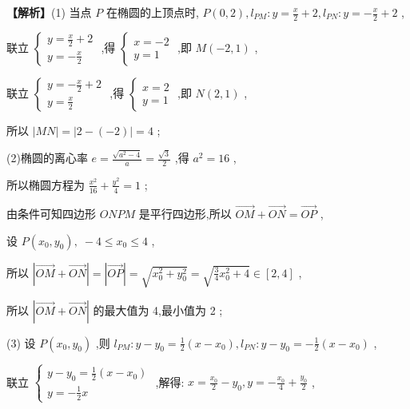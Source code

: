 \documentclass[10pt]{article}
\begin{document}
\textbf{【解析】}(1) 当点 \(P\) 在椭圆的上顶点时, \(P\left( {0,2}\right) ,{l}_{PM} : y = \frac{x}{2} + 2,{l}_{PN} : y =  - \frac{x}{2} + 2\) ,

联立 \(\left\{  \begin{array}{l} y = \frac{x}{2} + 2 \\  y =  - \frac{x}{2} \end{array}\right.\) ,得 \(\left\{  \begin{array}{l} x =  - 2 \\  y = 1 \end{array}\right.\) ,即 \(M\left( {-2,1}\right)\) ,

联立 \(\left\{  \begin{array}{l} y =  - \frac{x}{2} + 2 \\  y = \frac{x}{2} \end{array}\right.\) ,得 \(\left\{  \begin{array}{l} x = 2 \\  y = 1 \end{array}\right.\) ,即 \(N\left( {2,1}\right)\) ,

所以 \(\left| {MN}\right|  = \left| {2 - \left( {-2}\right) }\right|  = 4\) ;

(2)椭圆的离心率 \(e = \frac{\sqrt{{a}^{2} - 4}}{a} = \frac{\sqrt{3}}{2}\) ,得 \({a}^{2} = {16}\) ,

所以椭圆方程为 \(\frac{{x}^{2}}{16} + \frac{{y}^{2}}{4} = 1\) ;

由条件可知四边形 \({ONPM}\) 是平行四边形,所以 \(\overrightarrow{OM} + \overrightarrow{ON} = \overrightarrow{OP}\) ,

设 \(P\left( {{x}_{0},{y}_{0}}\right) ,\; - 4 \leq  {x}_{0} \leq  4\) ,

所以 \(\left| {\overrightarrow{OM} + \overrightarrow{ON}}\right|  = \left| \overrightarrow{OP}\right|  = \sqrt{{x}_{0}^{2} + {y}_{0}^{2}} = \sqrt{\frac{3}{4}{x}_{0}^{2} + 4} \in  \left\lbrack  {2,4}\right\rbrack\) ,

所以 \(\left| {\overrightarrow{OM} + \overrightarrow{ON}}\right|\) 的最大值为 4,最小值为 2 ;

(3) 设 \(P\left( {{x}_{0},{y}_{0}}\right)\) ,则 \({l}_{PM} : y - {y}_{0} = \frac{1}{2}\left( {x - {x}_{0}}\right) ,{l}_{PN} : y - {y}_{0} =  - \frac{1}{2}\left( {x - {x}_{0}}\right)\) ,

联立 \(\left\{  \begin{array}{l} y - {y}_{0} = \frac{1}{2}\left( {x - {x}_{0}}\right) \\  y =  - \frac{1}{2}x \end{array}\right.\) ,解得: \(x = \frac{{x}_{0}}{2} - {y}_{0}, y =  - \frac{{x}_{0}}{4} + \frac{{y}_{0}}{2}\) ,
\end{document}
